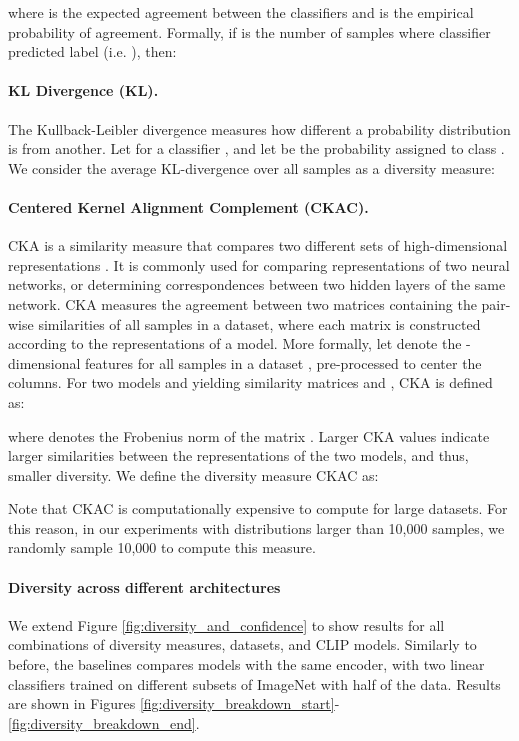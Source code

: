 where  is the expected agreement between the classifiers and  is the empirical probability of agreement. Formally, if  is the number of samples where classifier  predicted label  (i.e. ), then:


\paragraph{KL Divergence (KL).} The Kullback-Leibler divergence measures how different a probability distribution is from another. Let  for a classifier , and let  be the probability assigned to class . We consider the average KL-divergence over all samples as a diversity measure:



\paragraph{Centered Kernel Alignment Complement (CKAC).} CKA is a similarity measure that compares two different sets of high-dimensional representations \cite{kornblith2019similarity}. It is commonly used for comparing representations of two neural networks, or determining correspondences between two hidden layers of the same network. CKA measures the agreement between two matrices containing the pair-wise similarities of all samples in a dataset, where each matrix is constructed according to the representations of a model. More formally, let  denote the -dimensional features for all samples in a dataset , pre-processed to center the columns. For two models  and  yielding similarity matrices  and , CKA is defined as:


where  denotes the Frobenius norm of the matrix . Larger CKA values indicate larger similarities between the representations of the two models, and thus, smaller diversity. We define the diversity measure CKAC as:

Note that CKAC is computationally expensive to compute for large datasets. For this reason, in our experiments with distributions larger than 10,000 samples, we randomly sample 10,000 to compute this measure. 


\paragraph{Diversity across different architectures} We extend Figure \ref{fig:diversity_and_confidence} to show results for all combinations of diversity measures, datasets, and CLIP models. Similarly to before, the baselines compares models with the same encoder, with two linear classifiers trained on different subsets of ImageNet with half of the data. Results are shown in Figures \ref{fig:diversity_breakdown_start}-\ref{fig:diversity_breakdown_end}.

